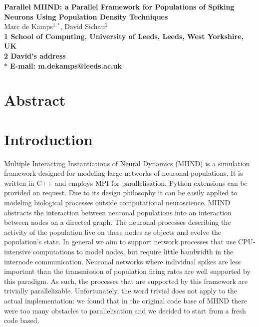 \documentclass[12pt]{article}
\date{}
\begin{document}
\begin{center}
\thispagestyle{empty}
{\Large
\textbf{Parallel MIIND: a Parallel Framework for Populations of Spiking Neurons Using Population Density Techniques}
}
\vspace{1.0cm}
\\
Marc de Kamps$^{1,\ast}$, 
David Sichau$^{2}$
\vspace{0.5cm}
\\
\bf{1} School of Computing, University of Leeds, Leeds, West Yorkshire, UK
\\
\bf{2} David's address
\\
\vspace{0.5cm}
$\ast$ E-mail: m.dekamps@leeds.ac.uk
\end{center}

\section*{Abstract}


\newpage 
\setcounter{page}{1}
\linenumbers

\section{Introduction}
Multiple Interacting Instantiations of Neural Dynamics \citep{dekamps2008} (MIIND) is a simulation framework designed for modeling large networks of 
neuronal populations. It is written in C++ and employs MPI \citep{gropp1998} for parallelisation. Python extensions can be provided on request. 
Due to its design philosophy it can be easily applied to modeling 
biological processes outside computational neuroscience. MIIND abstracts the interaction between neuronal populations into an interaction 
between nodes on a directed graph. The neuronal processes describing the activity of the population live on these nodes as objects and evolve 
the population’s state. In general we aim to support network processes that use CPU-intensive computations to model nodes, but
require little bandwidth in the internode communication. Neuronal networks where individual spikes are less important than the transmission
of population firing rates are well supported by this paradigm. As such, the processes that are supported by this framework are trivially
parallelizable. Unfortunately, the word trivial does not apply to the actual implementation: we found that in the original code base of MIIND there
were too many obstacles to parallelisation and we decided to start from a fresh code based. 
\end{document}
